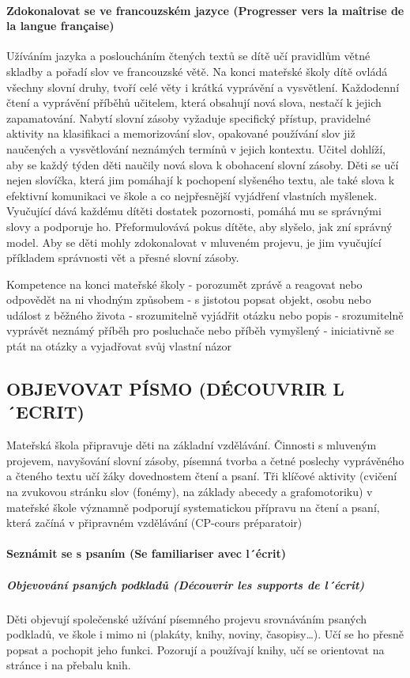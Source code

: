 		\paragraph{Zdokonalovat se ve francouzském jazyce (Progresser vers la maîtrise de la langue française)}
		Užíváním jazyka a posloucháním čtených textů se dítě učí pravidlům větné skladby a pořadí slov ve francouzské větě. Na konci mateřské školy dítě ovládá všechny slovní druhy, tvoří celé věty i krátká vyprávění a vysvětlení. Každodenní čtení a vyprávění příběhů učitelem, která obsahují nová slova, nestačí k jejich zapamatování. Nabytí slovní zásoby vyžaduje specifický přístup, pravidelné aktivity na klasifikaci a memorizování slov, opakované používání slov již naučených a vysvětlování neznámých termínů v jejich kontextu. Učitel dohlíží, aby se každý týden děti naučily nová slova k obohacení slovní zásoby. Děti se učí nejen slovíčka, která jim pomáhají k pochopení slyšeného textu, ale také slova k efektivní komunikaci ve škole a co nejpřesnější vyjádření vlastních myšlenek. Vyučující dává každému dítěti dostatek pozornosti, pomáhá mu se správnými slovy a podporuje ho. Přeformulovává pokus dítěte, aby slyšelo, jak zní správný model. Aby se děti mohly zdokonalovat v mluveném projevu, je jim vyučující příkladem správnosti vět a přesné slovní zásoby.

		Kompetence na konci mateřské školy
		- porozumět zprávě a reagovat nebo odpovědět na ni vhodným způsobem
		- s jistotou popsat objekt, osobu nebo událost z běžného života
		- srozumitelně vyjádřit otázku nebo popis
		- srozumitelně vyprávět neznámý příběh pro posluchače nebo příběh vymyšlený 
		- iniciativně se ptát na otázky a vyjadřovat svůj vlastní názor



	\subsection{OBJEVOVAT PÍSMO (DÉCOUVRIR L´ECRIT)}
		Mateřská škola připravuje děti na základní vzdělávání. Činnosti s mluveným projevem, navyšování slovní zásoby, písemná tvorba a četné poslechy vyprávěného a čteného textu učí žáky dovednostem čtení a psaní. Tři klíčové aktivity (cvičení na zvukovou stránku slov (fonémy), na základy abecedy a grafomotoriku) v mateřské škole významně podporují systematickou přípravu na čtení a psaní, která začíná v připravném vzdělávání (CP-cours préparatoir)

		\paragraph{Seznámit se s psaním (Se familiariser avec l´écrit)}
			\subparagraph{Objevování psaných podkladů (Découvrir les supports de l´écrit)}
			Děti objevují společenské užívání písemného projevu srovnáváním psaných podkladů, ve škole i mimo ni (plakáty, knihy, noviny, časopisy…). Učí se ho přesně popsat a pochopit jeho funkci. Pozorují a používají knihy, učí se orientovat na stránce i na přebalu knih. 

